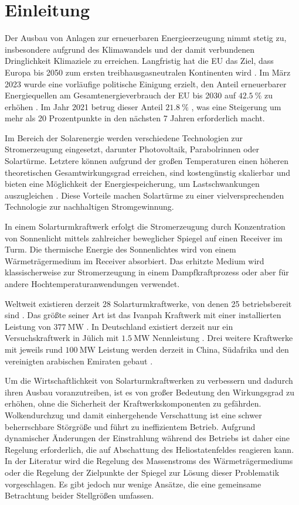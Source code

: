 \chapter{Einleitung} \label{ch_Einleitung}
Der Ausbau von Anlagen zur erneuerbaren Energieerzeugung nimmt stetig zu, insbesondere aufgrund des Klimawandels und der damit verbundenen Dringlichkeit Klimaziele zu erreichen.
Langfristig hat die EU das Ziel, dass Europa bis 2050 zum ersten treibhausgasneutralen Kontinenten wird \cite{Umweltbundesamt}.
Im März 2023 wurde eine vorläufige politische Einigung erzielt, den Anteil erneuerbarer Energiequellen am Gesamtenergieverbrauch der EU bis 2030 auf $\SI{42.5}{\percent}$ zu erhöhen \cite{RatEU}.
Im Jahr 2021 betrug dieser Anteil $\SI{21.8}{\percent}$ \cite{Destatis}, was eine Steigerung um mehr als 20 Prozentpunkte in den nächsten 7 Jahren erforderlich macht.

Im Bereich der Solarenergie werden verschiedene Technologien zur Stromerzeugung eingesetzt, darunter Photovoltaik, Parabolrinnen oder Solartürme.
Letztere können aufgrund der großen Temperaturen einen höheren theoretischen Gesamtwirkungsgrad erreichen, sind kostengünstig skalierbar und bieten eine Möglichkeit der Energiespeicherung, um Lastschwankungen auszugleichen \cite{Breeze}.
Diese Vorteile machen Solartürme zu einer vielversprechenden Technologie zur nachhaltigen Stromgewinnung.

In einem Solarturmkraftwerk erfolgt die Stromerzeugung durch Konzentration von Sonnenlicht mittels zahlreicher beweglicher Spiegel auf einen Receiver im Turm.
Die thermische Energie des Sonnenlichtes wird von einem Wärmeträgermedium im Receiver absorbiert.
Das erhitzte Medium wird klassischerweise zur Stromerzeugung in einem Dampfkraftprozess oder aber für andere Hochtemperaturanwendungen verwendet.

Weltweit existieren derzeit 28 Solarturmkraftwerke, von denen 25 betriebsbereit sind \cite{NREL1}.
Das größte seiner Art ist das Ivanpah Kraftwerk mit einer installierten Leistung von $\SI{377}{\mega\watt}$ \cite{NREL2}.
In Deutschland existiert derzeit nur ein Versuchskraftwerk in Jülich mit $\SI{1.5}{\mega\watt}$ Nennleistung \cite{NREL3}.
Drei weitere Kraftwerke mit jeweils rund $\SI{100}{\mega\watt}$ Leistung werden derzeit in China, Südafrika und den vereinigten arabischen Emiraten gebaut \cite{NREL4}.

Um die Wirtschaftlichkeit von Solarturmkraftwerken zu verbessern und dadurch ihren Ausbau voranzutreiben, ist es von großer Bedeutung den Wirkungsgrad zu erhöhen, ohne die Sicherheit der Kraftwerkskomponenten zu gefährden.
Wolkendurchzug und damit einhergehende Verschattung ist eine schwer beherrschbare Störgröße und führt zu ineffizientem Betrieb.
Aufgrund dynamischer Änderungen der Einstrahlung während des Betriebs ist daher eine Regelung erforderlich, die auf Abschattung des Heliostatenfeldes reagieren kann.
In der Literatur wird die Regelung des Massenstroms des Wärmeträgermediums oder die Regelung der Zielpunkte der Spiegel zur Lösung dieser Problematik vorgeschlagen.
Es gibt jedoch nur wenige Ansätze, die eine gemeinsame Betrachtung beider Stellgrößen umfassen.


